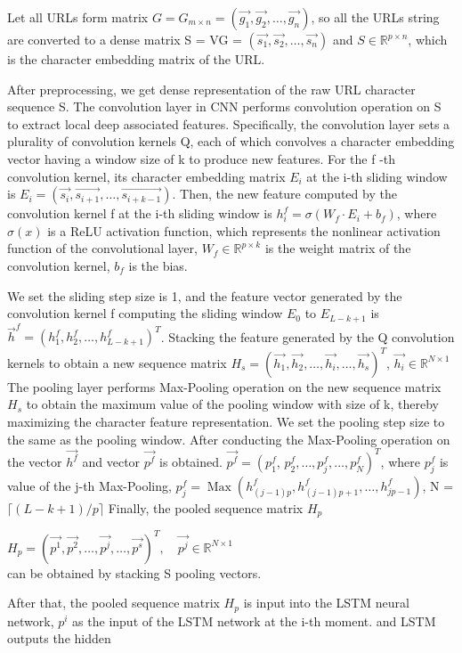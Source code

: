 \documentclass{ieeeaccess}
\begin{document}
Let all URLs form matrix $G=G_{m \times n}=(\overrightarrow{g_{1}}, \overrightarrow{g_{2}}, \ldots, \overrightarrow{g_{n}})$, so all the URLs string are converted to a dense matrix S = VG = $(\overrightarrow{s_{1}}, \overrightarrow{s_{2}}, \ldots, \overrightarrow{s_{n}})$ and $S \in \mathbb{R}^{p \times n}$, which is the character embedding matrix of the URL.
\par After preprocessing, we get dense representation of the raw
URL character sequence S. The convolution layer in CNN
performs convolution operation on S to extract local deep
associated features. Specifically, the convolution layer sets a
plurality of convolution kernels Q, each of which convolves
a character embedding vector having a window size of k to
produce new features. For the f -th convolution kernel, its
character embedding matrix $E_{i}$ at the i-th sliding window is $E_{i}=(\overrightarrow{s_{i}}, \overrightarrow{s_{i+1}}, \ldots, \overrightarrow{s_{i+k-1}})$. Then, the new feature computed
by the convolution kernel f at the i-th sliding window is $h_{i}^{f}=\sigma\left(W_{f} \cdot E_{i}+b_{f}\right)$, where $\sigma(x)$ is a ReLU activation function, which represents the nonlinear activation function of the convolutional layer, $W_{f} \in \mathbb{R}^{p \times k}$ is the weight matrix
of the convolution kernel, $b_{f}$ is the bias.
\par We set the sliding step size is 1, and the feature vector generated
by the convolution kernel f computing the sliding window $E_{0}$ to $E_{L-k+1}$ is $\vec{h}^{f}=\left(h_{1}^{f}, h_{2}^{f}, \ldots, h_{L-k+1}^{f}\right)^{T}$. Stacking the feature generated by the Q convolution kernels to obtain a new sequence matrix $H_{s}=(\overrightarrow{h_{1}}, \overrightarrow{h_{2}}, \ldots, \overrightarrow{h_{i}}, \ldots, \overrightarrow{h_{s}})^{T}$, $\overrightarrow{h_{i}} \in \mathbb{R}^{N \times 1}$ The pooling layer performs Max-Pooling operation on the new sequence matrix $H_{s}$ to obtain the
maximum value of the pooling window with size of k,
thereby maximizing the character feature representation.
We set the pooling step size to the same as the pooling
window. After conducting the Max-Pooling operation
on the vector $\overrightarrow{h^{f}}$ and vector $\overrightarrow{p^{f}}$ is obtained. $\overrightarrow{p^{f}}=\left(p_{1}^{f}\right.$, $\left.p_{2}^{f}, \ldots, p_{j}^{f}, \ldots, p_{N}^{f}\right)^{T}$, where $p_{j}^{f}$ is value of the j-th Max-Pooling, $p_{j}^{f}=\operatorname{Max}\left(h_{(j-1) p}^{f}, h_{(j-1) p+1}^{f}, \ldots, h_{j p-1}^{f}\right)$, N = $\lceil(L-k+1) / p\rceil$ Finally, the pooled sequence matrix $H_{p}$ \par $H_{p}=(\overrightarrow{p^{1}}, \overrightarrow{p^{2}}, \ldots, \overrightarrow{p^{j}}, \ldots, \overrightarrow{p^{s}})^{T}, \quad \overrightarrow{p^{j}} \in \mathbb{R}^{N \times 1}$ \vspace{6pt} \\ can be obtained by stacking S pooling vectors. \par After that, the pooled sequence matrix $H_{p}$ is input into the LSTM neural network, $p^{i}$ as the input of the LSTM network at the i-th moment. and LSTM outputs the hidden
\end{document}
